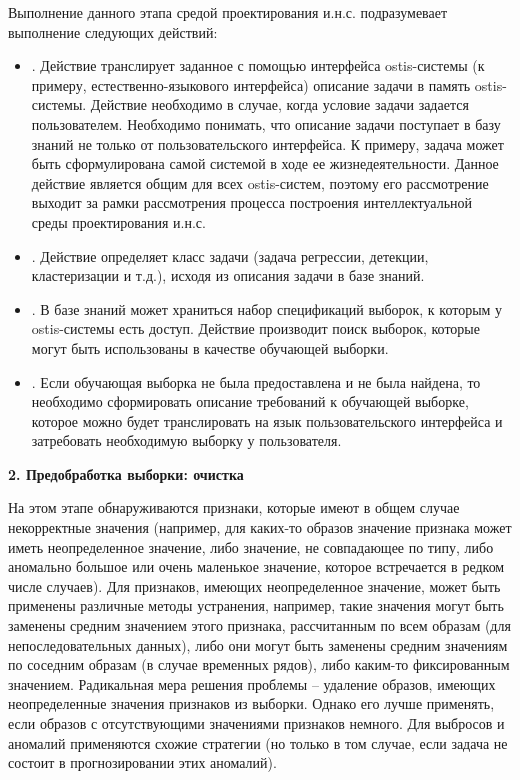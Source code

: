 Выполнение данного этапа средой проектирования и.н.с. подразумевает выполнение следующих действий:
\begin{itemize}
	\item {}. Действие транслирует заданное с помощью интерфейса ostis-системы (к примеру, естественно-языкового интерфейса) описание задачи в память ostis-системы. Действие необходимо в случае, когда условие задачи задается пользователем. Необходимо понимать, что описание задачи поступает в базу знаний не только от пользовательского интерфейса. К примеру, задача может быть сформулирована самой системой в ходе ее жизнедеятельности.
	Данное действие является общим для всех ostis-систем, поэтому его рассмотрение выходит за рамки рассмотрения процесса построения интеллектуальной среды проектирования и.н.с.
	\item {}. Действие определяет класс задачи (задача регрессии, детекции, кластеризации и т.д.), исходя из описания задачи в базе знаний.
	\item {}. В базе знаний может храниться набор спецификаций выборок, к которым у ostis-системы есть доступ. Действие производит поиск выборок, которые могут быть использованы в качестве обучающей выборки.
	\item {}. Если обучающая выборка не была предоставлена и не была найдена, то необходимо сформировать описание требований к обучающей выборке, которое можно будет транслировать на язык пользовательского интерфейса и затребовать необходимую выборку у пользователя.
\end{itemize}


\textbf{2. Предобработка выборки: очистка}

На этом этапе обнаруживаются признаки, которые имеют в общем случае некорректные значения (например, для каких-то образов значение признака может иметь неопределенное значение, либо значение, не совпадающее по типу, либо аномально большое или очень маленькое значение, которое встречается в редком числе случаев). Для признаков, имеющих неопределенное значение, может быть применены различные методы устранения, например, такие значения могут быть заменены средним значением этого признака, рассчитанным по всем образам (для непоследовательных данных), либо они могут быть заменены средним значениям по соседним образам (в случае временных рядов), либо каким-то фиксированным значением. Радикальная мера решения проблемы -- удаление образов, имеющих неопределенные значения признаков из выборки. Однако его лучше применять, если образов с отсутствующими значениями признаков немного. Для выбросов и аномалий применяются схожие стратегии (но только в том случае, если задача не состоит в прогнозировании этих аномалий).

